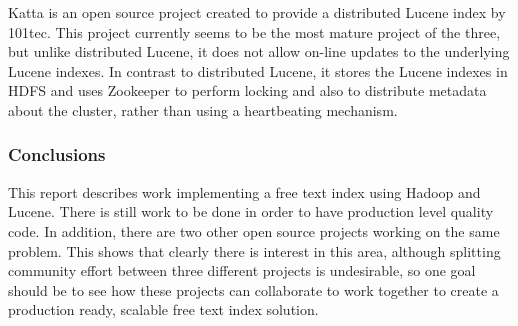 \documentclass[a4paper,10pt]{article}
\begin{document}
Katta \cite{katta} is an open source project created to provide a distributed Lucene index by 101tec. This project currently seems to be the most mature project of the three, but unlike distributed Lucene, it does not allow on-line updates to the underlying Lucene indexes. In contrast to distributed Lucene, it stores the Lucene indexes in HDFS and uses Zookeeper \cite{zookeeper} to perform locking and also to distribute metadata about the cluster, rather than using a heartbeating mechanism.

\subsubsection{Conclusions}

This report describes work implementing a free text index using Hadoop and Lucene. There is still work to be done in order to have production level quality code. In addition, there are two other open source projects working on the same problem. This shows that clearly there is interest in this area, although splitting community effort between three different projects is undesirable, so one goal should be to see how these projects can collaborate to work together to create a production ready, scalable free text index solution. 


 
\end{document}

